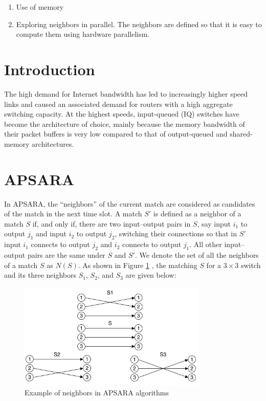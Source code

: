\documentclass[12pt	]{article}
\begin{document}
\begin{enumerate}
	\item Use of memory
	\item Exploring neighbors in parallel. The neighbors are deﬁned so that it is easy to compute them using hardware parallelism.
\end{enumerate}


\section{Introduction}
The high demand for Internet bandwidth has led to increasingly higher speed links and caused an associated demand for routers with a high aggregate switching capacity. At the highest speeds, input-queued (IQ) switches have become the architecture of choice, mainly because the memory bandwidth of their packet buffers is very low compared to that of output-queued and shared-memory architectures.


\section{APSARA}
In APSARA, the ``neighbors'' of the current match are considered as candidates of the match in the next time slot. A match $S'$ is defined as a neighbor of a match $S$ if, and only if, there are two input–output pairs in $S$, say input $i_1$ to output $j_1$ and input $i_2$ to output $j_2$, switching their connections so that in $S'$ input $i_1$ connects to output $j_2$ and $i_2$ connects to output $j_1$. All other input–output pairs are the same under $S$ and $S'$. We denote the set of all the neighbors of a match $S$ as $N(S)$. As shown in Figure \ref{fig:Example of neighbors in APSARA algorithms} \cite{giaccone2002towards}, the matching $S$ for a $3 \times 3$ switch and its three neighbors $S_1$, $S_2$, and $S_3$ are given below:



\begin{figure}[h!]
	\centering
	\includegraphics[width=0.8\textwidth]{Images/img5.png}
	\caption{Example of neighbors in APSARA algorithms}
	\label{fig:Example of neighbors in APSARA algorithms}
\end{figure}
\end{document}
